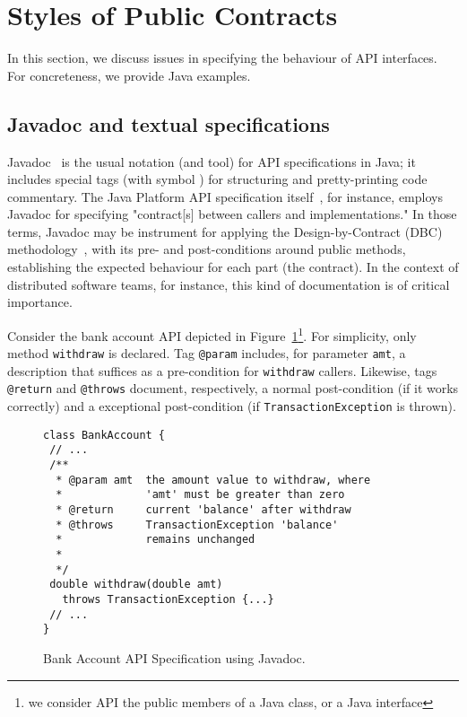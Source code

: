 \section{Styles of Public Contracts}
\label{sec:example}

In this section, we discuss issues in specifying the behaviour of API interfaces. For concreteness, we provide Java examples.

\subsection{Javadoc and textual specifications}

Javadoc~\cite{oracle-javadoc} is the usual notation (and tool) for API specifications in Java; it includes special tags (with symbol \@) for structuring and pretty-printing code commentary.
The Java Platform API specification itself~\cite{java-spec}, for instance, employs Javadoc for specifying "contract[s] between callers and implementations."
In those terms, Javadoc may be instrument for applying the Design-by-Contract (DBC) methodology~\cite{dbc}, with its pre- and post-conditions around public methods, establishing the expected behaviour for each part (the contract). In the context of distributed software teams, for instance, this kind of documentation is of critical importance. 


Consider the bank account API depicted in Figure~\ref{Fig-Javadoc-Bank}\footnote{we consider API the public members of a Java class, or a Java interface}. For simplicity, only method {\lstinline!withdraw!} is declared. Tag \lstinline!@param! includes, for parameter \lstinline!amt!, a description that suffices as a pre-condition for \lstinline!withdraw! callers. Likewise, tags \lstinline!@return! and \lstinline!@throws! document, respectively, a normal post-condition (if it works correctly) and a exceptional post-condition (if \lstinline!TransactionException! is thrown).


\begin{figure}
\centering
\begin{lstlisting}[basicstyle=\footnotesize\ttfamily,name=figxpi]
class BankAccount {
 // ...
 /**
  * @param amt  the amount value to withdraw, where
  *             'amt' must be greater than zero 
  * @return     current 'balance' after withdraw
  * @throws     TransactionException 'balance' 
  *             remains unchanged
  *
  */
 double withdraw(double amt) 
   throws TransactionException {...}
 // ...
}
\end{lstlisting}
\caption{Bank Account API Specification using Javadoc.}
\label{Fig-Javadoc-Bank}
\end{figure}


